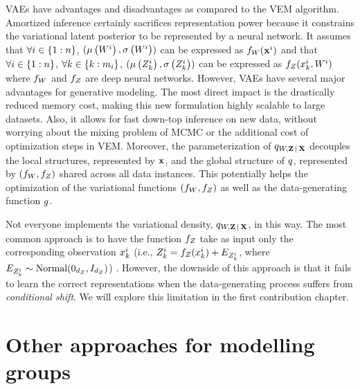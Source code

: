 \documentclass[../thesis.tex]{subfiles}
\begin{document}
VAEs have advantages and disadvantages as compared to the VEM algorithm. Amortized inference certainly sacrifices representation power because it constrains the variational latent posterior to be represented by a neural network. It assumes that $\forall i \in \{1:n\}$, $(\myvect{\mu} \left( \myrv{w}^i \right), \myvect{\sigma} \left( \myrv{w}^i \right))$ can be expressed as $\myfunc{f}_{\myrv{w}} (\mygroup{\myvect{x}}^i)$ and that $\forall i \in \{1:n\}$,  $\forall k \in \{k:m_i\}$, $(\myvect{\mu} \left( \myrv{z}^i_k \right), \myvect{\sigma} \left( \myrv{z}^i_k \right))$ can be expressed as $\myfunc{f}_{\myrv{z}} (\myvect{x}^i_k, \myrv{w}^i)$ where $\myfunc{f}_{\myrv{w}}$ and $\myfunc{f}_{\myrv{z}}$ are deep neural networks.  However, VAEs have several major advantages for generative modeling. The most direct impact is the drastically reduced memory cost, making this new formulation highly scalable to large datasets. Also, it allows for fast down-top inference on new data, without worrying about the mixing problem of MCMC or the additional cost of optimization steps in VEM. Moreover, the parameterization of $\myfunc{q}_{\myrv{w}, \mygroup{\myrv{z}} \,|\, \mygroup{\myrv{x}}}$ decouples the local structures, represented by $\mathbf{{x}}$, and the global structure of $q$, represented by $(\myfunc{f}_{\myrv{w}}, \myfunc{f}_{\myrv{z}})$ shared across all data instances. This potentially helps the optimization of the variational functions $(\myfunc{f}_{\myrv{w}}, \myfunc{f}_{\myrv{z}})$ as well as the data-generating function $g$.

Not everyone implements the variational density, $\myfunc{q}_{\myrv{w}, \mygroup{\myrv{z}} \,|\, \mygroup{\myrv{x}}}$, in this way. The most common approach is to have the function $\myfunc{f}_{\myrv{z}}$ take as input only the corresponding observation $x^i_k$ (i.e., $\myrv{z}^i_k = \myfunc{f}_{\myrv{z}} (\myvect{x}^i_k) + \myrv{e}_{\myrv{z}^i_k}$, where $\myrv{e}_{\myrv{z}^i_k} \sim \mathrm{Normal}(\myvect{0}_{\mydim{z}}, \myvect{I}_\mydim{z})$) \citep{bouchacourt2017multi,hosoyaGroupbasedLearningDisentangled2019}. However, the downside of this approach is that it fails to learn the correct representations when the data-generating process suffers from \textit{conditional shift}. We will explore this limitation in the first contribution chapter. \crit{[When?]}

\section{Other approaches for modelling groups}
\end{document}

